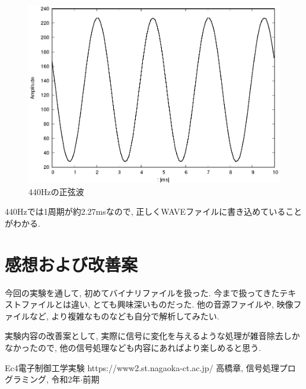 \documentclass[titlepage]{jsarticle}
\begin{document}
            \begin{figure}[ht]
                \centering
                \includegraphics[width=12cm]{images/440.eps}
                \caption{440Hzの正弦波}
                \label{fig:440}
            \end{figure}

            440Hzでは1周期が約2.27msなので, 正しくWAVEファイルに書き込めていることがわかる.

\section{感想および改善案}
    今回の実験を通して, 初めてバイナリファイルを扱った.
    今まで扱ってきたテキストファイルとは違い, とても興味深いものだった.
    他の音源ファイルや, 映像ファイルなど, より複雑なものなども自分で解析してみたい.

    実験内容の改善案として, 実際に信号に変化を与えるような処理が雑音除去しかなかったので,
    他の信号処理なども内容にあればより楽しめると思う.

\begin{thebibliography}{99}
     Ec4電子制御工学実験 https://www2.st.nagaoka-ct.ac.jp/
     高橋章, 信号処理プログラミング, 令和2年$\cdot$前期
\end{thebibliography}
\end{document}
